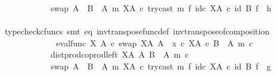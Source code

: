 \begin{isabellebody}
\ \ \ \ \ \ \ \ \ \ \ \ swap\ {\isacharparenleft}{\kern0pt}A\ {\isasymCoprod}\ {\isacharparenleft}{\kern0pt}B\ {\isasymsetminus}\ {\isacharparenleft}{\kern0pt}A{\isacharcomma}{\kern0pt}\ m{\isacharparenright}{\kern0pt}{\isacharparenright}{\kern0pt}{\isacharparenright}{\kern0pt}\ {\isacharparenleft}{\kern0pt}X\isactrlbsup A\isactrlesup {\isacharparenright}{\kern0pt}\ {\isasymcirc}\isactrlsub c\ try{\isacharunderscore}{\kern0pt}cast\ m\ {\isasymtimes}\isactrlsub f\ id\isactrlsub c\ {\isacharparenleft}{\kern0pt}X\isactrlbsup A\isactrlesup {\isacharparenright}{\kern0pt}{\isacharparenright}{\kern0pt}\isactrlsup {\isasymsharp}{\isacharparenright}{\kern0pt}{\isacharparenright}{\kern0pt}{\isacharparenright}{\kern0pt}\ {\isasymcirc}\isactrlsub c\ {\isacharparenleft}{\kern0pt}id\ B\ {\isasymtimes}\isactrlsub f\ \ h{\isacharparenright}{\kern0pt}{\isachardoublequoteclose}\isanewline
\ \ \ \ \ \ \ \ \ \ \ \ \isamarkupfalse%
\ {\isacharparenleft}{\kern0pt}typecheck{\isacharunderscore}{\kern0pt}cfuncs{\isacharcomma}{\kern0pt}\ smt\ eq\ inv{\isacharunderscore}{\kern0pt}transpose{\isacharunderscore}{\kern0pt}func{\isacharunderscore}{\kern0pt}def{}\ inv{\isacharunderscore}{\kern0pt}transpose{\isacharunderscore}{\kern0pt}of{\isacharunderscore}{\kern0pt}composition{\isacharparenright}{\kern0pt}\isanewline
\ \ \ \ \ \ \ \ \ \ \isamarkupfalse%
\ \isamarkupfalse%
\ {\isachardoublequoteopen}{\isacharparenleft}{\kern0pt}{\isacharparenleft}{\kern0pt}eval{\isacharunderscore}{\kern0pt}func\ X\ A\ {\isasymcirc}\isactrlsub c\ swap\ {\isacharparenleft}{\kern0pt}X\isactrlbsup A\isactrlesup {\isacharparenright}{\kern0pt}\ A{\isacharparenright}{\kern0pt}\ {\isasymamalg}\ {\isacharparenleft}{\kern0pt}x\ {\isasymcirc}\isactrlsub c\ {\isasymbeta}\isactrlbsub X\isactrlbsup A\isactrlesup \ {\isasymtimes}\isactrlsub c\ {\isacharparenleft}{\kern0pt}B\ {\isasymsetminus}\ {\isacharparenleft}{\kern0pt}A{\isacharcomma}{\kern0pt}\ m{\isacharparenright}{\kern0pt}{\isacharparenright}{\kern0pt}\isactrlesub {\isacharparenright}{\kern0pt}\ {\isasymcirc}\isactrlsub c\isanewline
\ \ \ \ \ \ \ \ \ \ \ \ dist{\isacharunderscore}{\kern0pt}prod{\isacharunderscore}{\kern0pt}coprod{\isacharunderscore}{\kern0pt}left\ {\isacharparenleft}{\kern0pt}X\isactrlbsup A\isactrlesup {\isacharparenright}{\kern0pt}\ A\ {\isacharparenleft}{\kern0pt}B\ {\isasymsetminus}\ {\isacharparenleft}{\kern0pt}A{\isacharcomma}{\kern0pt}\ m{\isacharparenright}{\kern0pt}{\isacharparenright}{\kern0pt}\ {\isasymcirc}\isactrlsub c\isanewline
\ \ \ \ \ \ \ \ \ \ \ \ swap\ {\isacharparenleft}{\kern0pt}A\ {\isasymCoprod}\ {\isacharparenleft}{\kern0pt}B\ {\isasymsetminus}\ {\isacharparenleft}{\kern0pt}A{\isacharcomma}{\kern0pt}\ m{\isacharparenright}{\kern0pt}{\isacharparenright}{\kern0pt}{\isacharparenright}{\kern0pt}\ {\isacharparenleft}{\kern0pt}X\isactrlbsup A\isactrlesup {\isacharparenright}{\kern0pt}\ {\isasymcirc}\isactrlsub c\ try{\isacharunderscore}{\kern0pt}cast\ m\ {\isasymtimes}\isactrlsub f\ id\isactrlsub c\ {\isacharparenleft}{\kern0pt}X\isactrlbsup A\isactrlesup {\isacharparenright}{\kern0pt}{\isacharparenright}{\kern0pt}\ {\isasymcirc}\isactrlsub c\ {\isacharparenleft}{\kern0pt}id\ B\ {\isasymtimes}\isactrlsub f\ \ g{\isacharparenright}{\kern0pt}\isanewline

\end{isabellebody}
